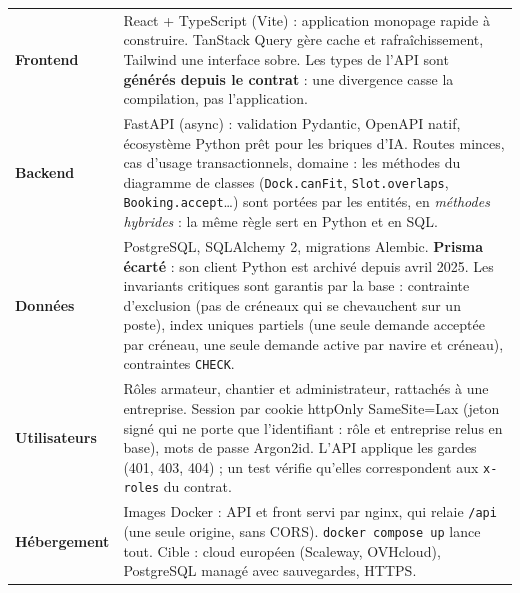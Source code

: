 \documentclass[10pt,a4paper]{article}
\newcommand{\code}[1]{\texttt{\small #1}}
\begin{document}
\vspace{-4pt}
{\small
\renewcommand{\arraystretch}{1.18}
\begin{tabularx}{\linewidth}{@{}>{\bfseries\color{brand}}p{2.05cm}X@{}}
\toprule
Frontend & React + TypeScript (Vite) : application monopage rapide à construire. TanStack Query gère cache et rafraîchissement, Tailwind une interface sobre. Les types de l'API sont \textbf{générés depuis le contrat} : une divergence casse la compilation, pas l'application. \\
Backend & FastAPI (async) : validation Pydantic, OpenAPI natif, écosystème Python prêt pour les briques d'IA. Routes minces, cas d'usage transactionnels, domaine : les méthodes du diagramme de classes (\code{Dock.canFit}, \code{Slot.overlaps}, \code{Booking.accept}…) sont portées par les entités, en \emph{méthodes hybrides} : la même règle sert en Python et en SQL. \\
Données & PostgreSQL, SQLAlchemy 2, migrations Alembic. \textbf{Prisma écarté} : son client Python est archivé depuis avril 2025. Les invariants critiques sont garantis par la base : contrainte d'exclusion (pas de créneaux qui se chevauchent sur un poste), index uniques partiels (une seule demande acceptée par créneau, une seule demande active par navire et créneau), contraintes \code{CHECK}. \\
Utilisateurs & Rôles armateur, chantier et administrateur, rattachés à une entreprise. Session par cookie httpOnly SameSite=Lax (jeton signé qui ne porte que l'identifiant : rôle et entreprise relus en base), mots de passe Argon2id. L'API applique les gardes (401, 403, 404) ; un test vérifie qu'elles correspondent aux \code{x-roles} du contrat. \\
Hébergement & Images Docker : API et front servi par nginx, qui relaie \code{/api} (une seule origine, sans CORS). \code{docker compose up} lance tout. Cible : cloud européen (Scaleway, OVHcloud), PostgreSQL managé avec sauvegardes, HTTPS. \\
\bottomrule
\end{tabularx}}
\end{document}
